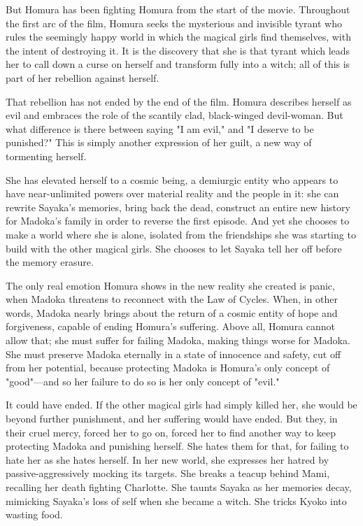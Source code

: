 But Homura has been fighting Homura from the start of the movie. Throughout the first arc of the film, Homura seeks the mysterious and invisible tyrant who rules the seemingly happy world in which the magical girls find themselves, with the intent of destroying it. It is the discovery that she is that tyrant which leads her to call down a curse on herself and transform fully into a witch; all of this is part of her rebellion against herself. 

That rebellion has not ended by the end of the film. Homura describes herself as evil and embraces the role of the scantily clad, black-winged devil-woman. But what difference is there between saying "I am evil," and "I deserve to be punished?" This is simply another expression of her guilt, a new way of tormenting herself. 

She has elevated herself to a cosmic being, a demiurgic entity who appears to have near-unlimited powers over material reality and the people in it: she can rewrite Sayaka's memories, bring back the dead, construct an entire new history for Madoka's family in order to reverse the first episode. And yet she chooses to make a world where she is alone, isolated from the friendships she was starting to build with the other magical girls. She chooses to let Sayaka tell her off before the memory erasure.

The only real emotion Homura shows in the new reality she created is panic, when Madoka threatens to reconnect with the Law of Cycles. When, in other words, Madoka nearly brings about the return of a cosmic entity of hope and forgiveness, capable of ending Homura's suffering. Above all, Homura cannot allow that; she must suffer for failing Madoka, making things worse for Madoka. She must preserve Madoka eternally in a state of innocence and safety, cut off from her potential, because protecting Madoka is Homura's only concept of "good"—and so her failure to do so is her only concept of "evil."

It could have ended. If the other magical girls had simply killed her, she would be beyond further punishment, and her suffering would have ended. But they, in their cruel mercy, forced her to go on, forced her to find another way to keep protecting Madoka and punishing herself. She hates them for that, for failing to hate her as she hates herself. In her new world, she expresses her hatred by passive-aggressively mocking its targets. She breaks a teacup behind Mami, recalling her death fighting Charlotte. She taunts Sayaka as her memories decay, mimicking Sayaka's loss of self when she became a witch. She tricks Kyoko into wasting food.

